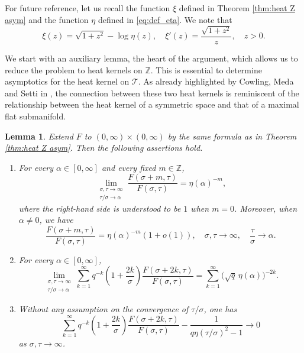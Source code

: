 \documentclass[11pt,a4paper,reqno]{amsart}
\renewcommand\mathcal{\mathscr}
\theoremstyle{plain}
\newtheorem{lemma}[theorem]{Lemma}
\theoremstyle{remark}
\theoremstyle{definition}
\theoremstyle{remark}
\numberwithin{equation}{section}
\begin{document}
For future reference, let us recall the function 
	 $\xi$ defined in Theorem \ref{thm:heat Z asym} and the function $\eta$ defined in \eqref{eq:def_eta}. We note that 
\begin{equation}\label{eq:xieta}
\xi(z)=\sqrt{1+z^2}-\log\eta(z),\quad \xi'(z)=\frac{\sqrt{1+z^2}}{z}, \quad z>0.
\end{equation}



We start with an auxiliary lemma, the heart of the argument, which allows us to reduce the problem to heat kernels on $\mathbb{Z}$. This is essential to determine asymptotics for the heat kernel on $\mathcal{T}$. As already highlighted by Cowling, Meda and Setti in \cite[p.4280]{CMS}, the connection between these two heat kernels is reminiscent of the relationship between the heat kernel of a symmetric space and that of a maximal flat submanifold. 

\begin{lemma}\label{lem:F-ratios-corrected}
Extend $F$ to $(0,\infty)\times(0,\infty)$ by the same formula as in
Theorem \ref{thm:heat Z asym}. Then the following assertions hold.

\begin{enumerate}
\item[\rm(i)]
For every $\alpha\in[0,\infty]$ and every fixed
$m\in \mathbb{Z}$,
\[
\lim_{\substack{\sigma,\tau\to\infty\\ \tau/\sigma\to\alpha}}
\frac{F(\sigma+m,\tau)}{F(\sigma,\tau)}
=
\eta(\alpha)^{-m},
\]
where the right-hand side is understood to be $1$ when $m=0$. Moreover, when $\alpha\neq0$, we have 
\[
\frac{F(\sigma+m,\tau)}{F(\sigma,\tau)}
=
\eta(\alpha)^{-m}(1+o(1)), \quad \sigma, \tau\to \infty, \quad \frac{\tau}{\sigma}\to \alpha.
\]
\item[\rm(ii)]
For every $\alpha\in[0,\infty]$,
\[
\lim_{\substack{\sigma,\tau\to\infty\\ \tau/\sigma\to\alpha}}
\sum_{k=1}^{\infty}
q^{-k}
\left(1+\frac{2k}{\sigma}\right)
\frac{F(\sigma+2k,\tau)}{F(\sigma,\tau)}
=
\sum_{k=1}^{\infty}
\bigl(\sqrt q\,\eta(\alpha)\bigr)^{-2k}.
\]

\item[\rm(iii)]
Without any assumption on the convergence of $\tau/\sigma$, one has
\[
\sum_{k=1}^{\infty}
q^{-k}
\left(1+\frac{2k}{\sigma}\right)
\frac{F(\sigma+2k,\tau)}{F(\sigma,\tau)}
-
\frac{1}{q\eta(\tau/\sigma)^2-1}
\to 0
\]
as $\sigma,\tau\to\infty$.

\end{enumerate}
\end{lemma}
\end{document}
